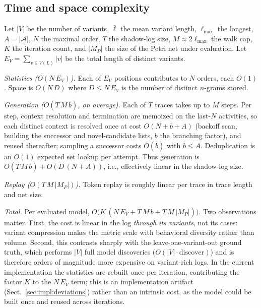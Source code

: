 \documentclass[runningheads]{llncs}
\begin{document}
\subsection{Time and space complexity}
\label{sec:method:complexity}
Let $|V|$ be the number of variants, $\bar\ell$ the mean variant length, $\ell_{\max}$ the longest, $A=|\mathcal{A}|$, $N$ the maximal order, $T$ the shadow-log size, $M\!\approx\!2\ell_{\max}$ the walk cap, $K$ the iteration count, and $|M_P|$ the size of the Petri net under evaluation. Let $E_V=\sum_{v\in V(L)}|v|$ be the total length of distinct variants.

\emph{Statistics ($O(N\,E_V)$).} Each of $E_V$ positions contributes to $N$ orders, each $O(1)$. Space is $O(N\,D)$ where $D\le N\,E_V$ is the number of distinct $n$-grams stored.

\emph{Generation ($O(T\,M\,\bar b)$, on average).} Each of $T$ traces takes up to $M$ steps. Per step, context resolution and termination are memoized on the last-$N$ activities, so each distinct context is resolved once at cost $O(N+b+A)$ (backoff scan, building the successor and novel-candidate lists, $b$ the branching factor), and reused thereafter; sampling a successor costs $O(\bar b)$ with $\bar b\le A$. Deduplication is an $O(1)$ expected set lookup per attempt. Thus generation is $O(T\,M\,\bar b)+O(D\,(N+A))$, i.e., effectively linear in the shadow-log size.

\emph{Replay ($O(T\,M\,|M_P|)$).} Token replay is roughly linear per trace in trace length and net size.

\emph{Total.} Per evaluated model, $O\!\big(K\,(N\,E_V + T\,M\,\bar b + T\,M\,|M_P|)\big)$. Two observations matter. First, the cost is linear in the log \emph{through its variants}, not its cases: variant compression makes the metric scale with behavioral diversity rather than volume. Second, this contrasts sharply with the leave-one-variant-out ground truth, which performs $|V|$ full model discoveries ($O(|V|\cdot\mathrm{discover})$) and is therefore orders of magnitude more expensive on variant-rich logs. In the current implementation the statistics are rebuilt once per iteration, contributing the factor $K$ to the $N\,E_V$ term; this is an implementation artifact (Sect.~\ref{sec:impl:deviations}) rather than an intrinsic cost, as the model could be built once and reused across iterations.
\end{document}

